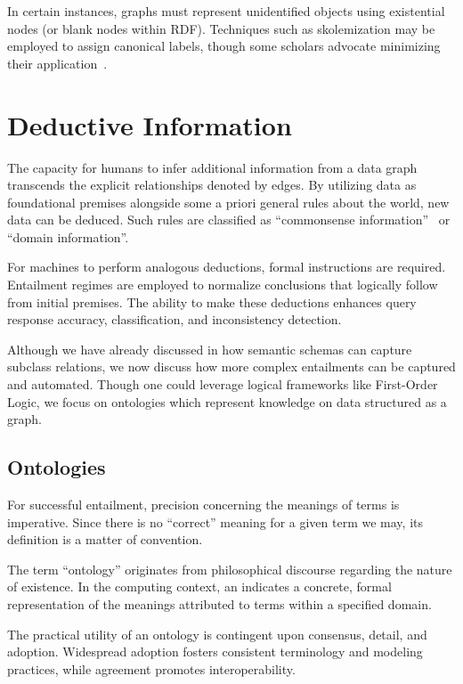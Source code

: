 In certain instances, graphs must represent unidentified objects using existential nodes (or blank nodes within RDF). Techniques such as skolemization may be employed to assign canonical labels, though some scholars advocate minimizing their application~\cite{Cyganiak2014rdf, Hogan2017CanonicalFormsIsomorphicEquivalentRDFGraphs, Longley2019RDFDatasetNormalization}.

\section{Deductive Information}\label{deductive-information}
The capacity for humans to infer additional information from a data graph transcends the explicit relationships denoted by edges. By utilizing data as foundational premises alongside some a priori general rules about the world, new data can be deduced. Such rules are classified as ``commonsense information''~\cite{McCarthy1990FomalizingCommonsense} or ``domain information''.

For machines to perform analogous deductions, formal instructions are required. Entailment regimes are employed to normalize conclusions that logically follow from initial premises. The ability to make these deductions enhances query response accuracy, classification, and inconsistency detection.

Although we have already discussed in  how semantic schemas can capture subclass relations, we now discuss how more complex entailments can be captured and automated. Though one could leverage logical frameworks like First-Order Logic, we focus on ontologies which represent knowledge on data structured as a graph.

\subsection{Ontologies}\label{ontologies}
For successful entailment, precision concerning the meanings of terms is imperative. Since there is no ``correct'' meaning for a given term we may, its definition is a matter of convention.

The term ``ontology'' originates from philosophical discourse regarding the nature of existence. In the computing context, an  indicates a concrete, formal representation of the meanings attributed to terms within a specified domain.

The practical utility of an ontology is contingent upon consensus, detail, and adoption. Widespread adoption fosters consistent terminology and modeling practices, while agreement promotes interoperability.

